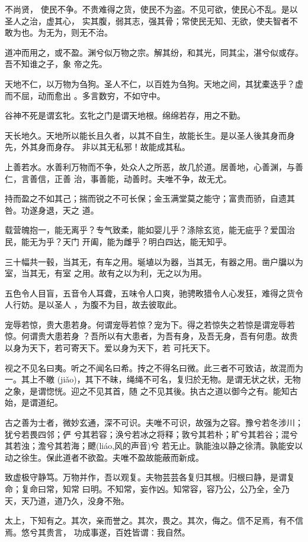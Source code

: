 \documentclass[a4paper, twoside, openany, extrafontsizes]{dlutthesis}
\begin{document}
不尚贤， 使民不争。不贵难得之货，使民不为盗。不见可欲，使民心不乱。是以圣人之治，虚其心，
实其腹，弱其志，强其骨；常使民无知、无欲，使夫智者不敢为也。为无为，则无不治。

道冲而用之，或不盈。渊兮似万物之宗。解其纷，和其光，同其尘，湛兮似或存。吾不知谁之子，象
帝之先。

天地不仁，以万物为刍狗。圣人不仁，以百姓为刍狗。天地之间，其犹橐迭乎？虚而不屈，动而愈出
。多言数穷，不如守中。

谷神不死是谓玄牝。玄牝之门是谓天地根。绵绵若存，用之不勤。

天长地久。天地所以能长且久者，以其不自生，故能长生。是以圣人後其身而身先，外其身而身存。
非以其无私邪！故能成其私。

上善若水。水善利万物而不争，处众人之所恶，故几於道。居善地，心善渊，与善仁，言善信，正善
治，事善能，动善时。夫唯不争，故无尤。

持而盈之不如其己；揣而锐之不可长保；金玉满堂莫之能守；富贵而骄，自遗其咎。功遂身退，天之
道。

载营魄抱一，能无离乎？专气致柔，能如婴儿乎？涤除玄览，能无疵乎？爱国治民，能无为乎？天门
开阖，能为雌乎？明白四达，能无知乎。

三十幅共一毂，当其无，有车之用。埏埴以为器，当其无，有器之用。凿户牖以为室，当其无，有室
之用。故有之以为利，无之以为用。

五色令人目盲，五音令人耳聋，五味令人口爽，驰骋畋猎令人心发狂，难得之货令人行妨。是以圣人
，为腹不为目，故去彼取此。

宠辱若惊，贵大患若身。何谓宠辱若惊？宠为下。得之若惊失之若惊是谓宠辱若惊。何谓贵大患若身
？吾所以有大患者，为吾有身，及吾无身，吾有何患。故贵以身为天下，若可寄天下。爱以身为天下，若
可托天下。

视之不见名曰夷。听之不闻名曰希。抟之不得名曰微。此三者不可致诘，故混而为一。其上不皦
(jiǎo)，其下不昧，绳绳不可名，复归於无物。是谓无状之状，无物之象，是谓惚恍。迎之不见其首，随
之不见其後。执古之道以御今之有。能知古始，是谓道纪。

古之善为士者，微妙玄通，深不可识。夫唯不可识，故强为之容。豫兮若冬涉川；犹兮若畏四邻；俨
兮其若容；涣兮若冰之将释；敦兮其若朴；旷兮其若谷；混兮其若浊；澹兮其若海；飉(liáo,风的声音)兮
若无止。孰能浊以静之徐清。孰能安以动之徐生。保此道者不欲盈。夫唯不盈故能蔽而新成。

致虚极守静笃。万物并作，吾以观复。夫物芸芸各复归其根。归根曰静，是谓复命；复命曰常，知常
曰明。不知常，妄作凶。知常容，容乃公，公乃全，全乃天，天乃道，道乃久，没身不殆。

太上，下知有之。其次，亲而誉之。其次，畏之。其次，侮之。信不足焉，有不信焉。悠兮其贵言，
功成事遂，百姓皆谓∶我自然。
\end{document}
